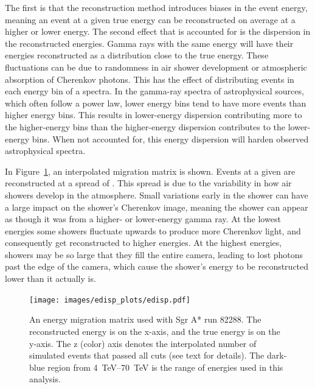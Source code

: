     The first is that the reconstruction method introduces biases in the event energy, meaning an event at a given true energy can be reconstructed on average at a higher or lower energy.
    The second effect that is accounted for is the dispersion in the reconstructed energies.
    Gamma rays with the same energy will have their energies reconstructed as a distribution close to the true energy.
    These fluctuations can be due to randomness in air shower development or atmospheric absorption of Cherenkov photons.
    This has the effect of distributing events in each energy bin of a spectra.
    In the gamma-ray spectra of astrophysical sources, which often follow a power law, lower energy bins tend to have more events than higher energy bins.
    This results in lower-energy dispersion contributing more to the higher-energy bins than the higher-energy dispersion contributes to the lower-energy bins.
    When not accounted for, this energy dispersion will harden observed astrophysical spectra.
    
    In Figure~\ref{fig:migmatrix}, an interpolated migration matrix is shown.
    Events at a given \ETrue{} are reconstructed at a spread of \EReco{}.
    This spread is due to the variability in how air showers develop in the atmosphere.
    Small variations early in the shower can have a large impact on the shower's Cherenkov image, meaning the shower can appear as though it was from a higher- or lower-energy gamma ray.
    At the lowest \ETrue{} energies some showers fluctuate upwards to produce more Cherenkov light, and consequently get reconstructed to higher \EReco{} energies.
    At the highest \ETrue{} energies, showers may be so large that they fill the entire camera, leading to lost photons past the edge of the camera, which cause the shower's energy to be reconstructed lower than it actually is.

    \begin{figure}[!th]
      \centering
      \texttt{[image: images/edisp\_plots/edisp.pdf]}
      \caption[Energy Migration Matrix]{
        An energy migration matrix used with Sgr A* run 82288.
        The reconstructed energy is on the x-axis, and the true energy is on the y-axis.
        The z (color) axis denotes the interpolated number of simulated events that passed all cuts (see text for details).
        The dark-blue region from \SIrange{4}{70}{TeV} \EReco{} is the range of energies used in this analysis.
      }
      \label{fig:migmatrix}
    \end{figure}
  
